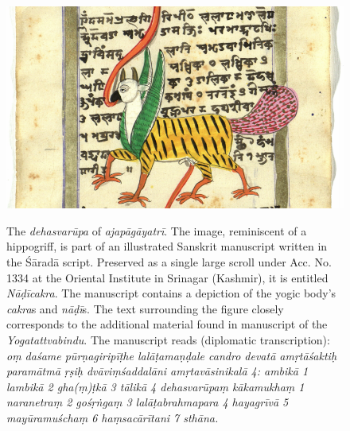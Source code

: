   \begin{figure}[ht]
	\centering
  \includegraphics[width=1\textwidth]{pics/Wolpertinger.png}
\caption[The \textit{dehasvarūpa} of \textit{ajapāgāyatrī}]{The \textit{dehasvarūpa} of \textit{ajapāgāyatrī}. The image, reminiscent of a hippogriff, is part of an illustrated Sanskrit manuscript written in the Śāradā script. Preserved as a single large scroll under Acc. No. 1334 at the Oriental Institute in Srinagar (Kashmir), it is entitled \textit{Nāḍīcakra}. The manuscript contains a depiction of the yogic body’s \textit{cakra}s and \textit{nāḍī}s. The text surrounding the figure closely corresponds to the additional material found in manuscript  of the \textit{Yogatattvabindu}. The manuscript reads (diplomatic transcription): \textit{oṃ daśame pūrṇagiripīṭhe lalāṭamaṇḍale candro devatā amṛtāśaktiḥ paramātmā ṛṣiḥ dvāviṃśaddalāni amṛtavāsinikalā 4: ambikā 1 lambikā 2 gha(ṃ)ṭkā 3 tālikā 4 dehasvarūpaṃ kākamukhaṃ 1 naranetraṃ 2 gośṛṅgaṃ 3 lalāṭabrahmapara 4 hayagrīvā 5 mayūramuśchaṃ 6 haṃsacārītani 7 sthāna.}}
	\label{fig_wolpertinger}
      \end{figure}

      \clearpage

